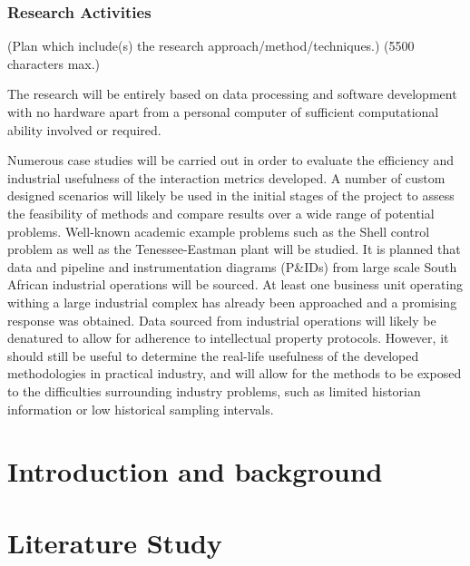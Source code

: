 \documentclass[a4paper]{book}
\begin{document}

\subsection{Research Activities}
(Plan which include(s) the research approach/method/techniques.)
(5500 characters max.)

The research will be entirely based on data processing and software development with no hardware apart from a personal computer of sufficient computational ability involved or required.

Numerous case studies will be carried out in order to evaluate the efficiency and industrial usefulness of the interaction metrics developed.
A number of custom designed scenarios will likely be used in the initial stages of the project to assess the feasibility of methods and compare results over a wide range of potential problems.
Well-known academic example problems such as the Shell control problem as well as the Tenessee-Eastman plant will be studied.
It is planned that data and pipeline and instrumentation diagrams (P\&IDs) from large scale South African industrial operations will be sourced.
At least one business unit operating withing a large industrial complex has already been approached and a promising response was obtained.
Data sourced from industrial operations will likely be denatured to allow for adherence to intellectual property protocols.
However, it should still be useful to determine the real-life usefulness of the developed methodologies in practical industry, and will allow for the methods to be exposed to the difficulties surrounding industry problems, such as limited historian information or low historical sampling intervals.

\mainmatter
\chapter{Introduction and background}

\chapter{Literature Study}

\end{document}
